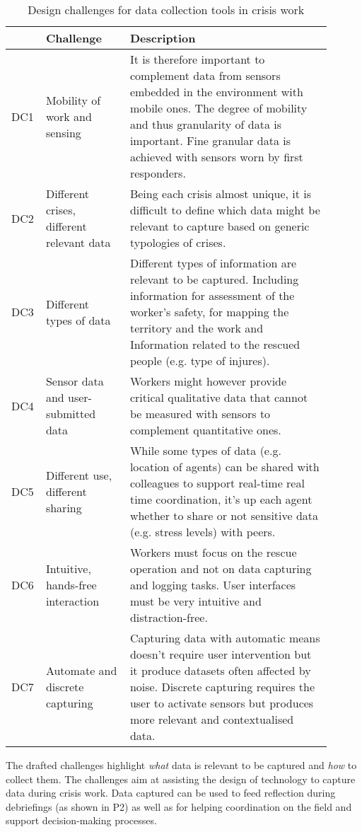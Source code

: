 \begin{table}
	[tbh] \centering \caption{Design challenges for data collection tools in crisis work} \label{tab:design-challenges} 
	\begin{tabular}
		{@{}p{0.05\linewidth}p{0.25\linewidth}p{0.60\linewidth}@{}} \toprule & Challenge & Description \\
		\midrule DC1 & Mobility of work and sensing & It is therefore important to complement data from sensors embedded in the environment with mobile ones. The degree of mobility and thus granularity of data is important. Fine granular data is achieved with sensors worn by first responders. \\
		DC2 & Different crises, different relevant data & Being each crisis almost unique, it is difficult to define which data might be relevant to capture based on generic typologies of crises. \\
		DC3 & Different types of data & Different types of information are relevant to be captured. Including information for assessment of the worker’s safety, for mapping the territory and the work and Information related to the rescued people (e.g. type of injures). \\
		DC4 & Sensor data and user-submitted data & Workers might however provide critical qualitative data that cannot be measured with sensors to complement quantitative ones. \\
		DC5 & Different use, different sharing & While some types of data (e.g. location of agents) can be shared with colleagues to support real-time real time coordination, it's up each agent whether to share or not sensitive data (e.g. stress levels) with peers. \\
		DC6 & Intuitive, hands-free interaction & Workers must focus on the rescue operation and not on data capturing and logging tasks. User interfaces must be very intuitive and distraction-free. \\
		DC7 & Automate and discrete capturing & Capturing data with automatic means doesn't require user intervention but it produce datasets often affected by noise. Discrete capturing requires the user to activate sensors but produces more relevant and contextualised data. \\
		\bottomrule 
	\end{tabular}
\end{table}

The drafted challenges highlight \emph{what} data is relevant to be captured and \emph{how} to collect them. The challenges aim at assisting the design of technology to capture data during crisis work. Data captured can be used to feed reflection during debriefings (as shown in P2) as well as for helping coordination on the field and support decision-making processes.

